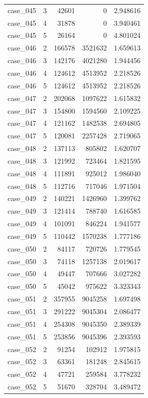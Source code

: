 \begin{longtable}{lrrrr}
case\_045 & 3 & 42601 & 0 & 2.948616 \\
case\_045 & 4 & 31878 & 0 & 3.940461 \\
case\_045 & 5 & 26164 & 0 & 4.801024 \\
case\_046 & 2 & 166578 & 3521632 & 1.659613 \\
case\_046 & 3 & 142176 & 4021280 & 1.944456 \\
case\_046 & 4 & 124612 & 4513952 & 2.218526 \\
case\_046 & 5 & 124612 & 4513952 & 2.218526 \\
case\_047 & 2 & 202068 & 1097622 & 1.615832 \\
case\_047 & 3 & 154800 & 1594560 & 2.109225 \\
case\_047 & 4 & 121162 & 1482538 & 2.694805 \\
case\_047 & 5 & 120081 & 2257428 & 2.719065 \\
case\_048 & 2 & 137113 & 805802 & 1.620707 \\
case\_048 & 3 & 121992 & 723464 & 1.821595 \\
case\_048 & 4 & 111891 & 925012 & 1.986040 \\
case\_048 & 5 & 112716 & 717046 & 1.971504 \\
case\_049 & 2 & 140221 & 1426960 & 1.399762 \\
case\_049 & 3 & 121414 & 788740 & 1.616585 \\
case\_049 & 4 & 101091 & 846224 & 1.941577 \\
case\_049 & 5 & 110442 & 1570238 & 1.777186 \\
case\_050 & 2 & 84117 & 720726 & 1.779545 \\
case\_050 & 3 & 74118 & 1257138 & 2.019617 \\
case\_050 & 4 & 49447 & 707666 & 3.027282 \\
case\_050 & 5 & 45042 & 975622 & 3.323343 \\
case\_051 & 2 & 357955 & 9045258 & 1.697498 \\
case\_051 & 3 & 291222 & 9045304 & 2.086477 \\
case\_051 & 4 & 254308 & 9045350 & 2.389339 \\
case\_051 & 5 & 253856 & 9045396 & 2.393593 \\
case\_052 & 2 & 91254 & 102912 & 1.975815 \\
case\_052 & 3 & 63361 & 181248 & 2.845615 \\
case\_052 & 4 & 47721 & 259584 & 3.778232 \\
case\_052 & 5 & 51670 & 328704 & 3.489472 \\

\end{longtable}
